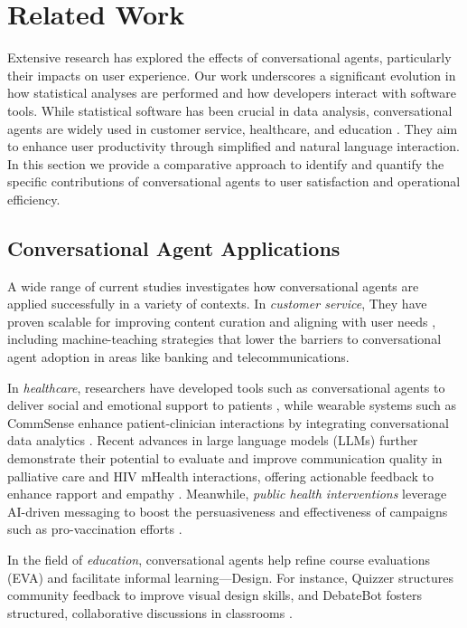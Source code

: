 \section{Related Work}
Extensive research has explored the effects of conversational agents, particularly their impacts on user experience. Our work underscores a significant evolution in how statistical analyses are performed and how developers interact with software tools. While statistical software has been crucial in data analysis, conversational agents are widely used in customer service, healthcare, and education \cite{Folstad2017}. They aim to enhance user productivity through simplified and natural language interaction. In this section we provide a comparative approach to identify and quantify the specific contributions of conversational agents to user satisfaction and operational efficiency.
\subsection{Conversational Agent Applications}
A wide range of current studies investigates how conversational agents are applied successfully in a variety of contexts.\cite{catania2023conversational} In \textit{customer service}, They have proven scalable for improving content curation and aligning with user needs \citep{candello2022}, including machine-teaching strategies that lower the barriers to conversational agent adoption in areas like banking and telecommunications. 

In \textit{healthcare}, researchers have developed tools such as conversational agents to deliver social and emotional support to patients \citep{wang2021, he2023conversational}, while wearable systems such as CommSense enhance patient-clinician interactions by integrating conversational data analytics \cite{wang2024}. Recent advances in large language models (LLMs) further demonstrate their potential to evaluate and improve communication quality in palliative care and HIV mHealth interactions, offering actionable feedback to enhance rapport and empathy \citep{Wang2025, Wang2024chi}. Meanwhile, \textit{public health interventions} leverage AI-driven messaging to boost the persuasiveness and effectiveness of campaigns such as pro-vaccination efforts \cite{karinshak2023}. 

In the field of \textit{education}, conversational agents help refine course evaluations (EVA) and facilitate informal learning—Design. For instance, Quizzer \cite{schmitt2022} structures community feedback to improve visual design skills\cite{peng2024}, and DebateBot \cite{kim2021} fosters structured, collaborative discussions in classrooms \cite{wambsganss2022}. 

